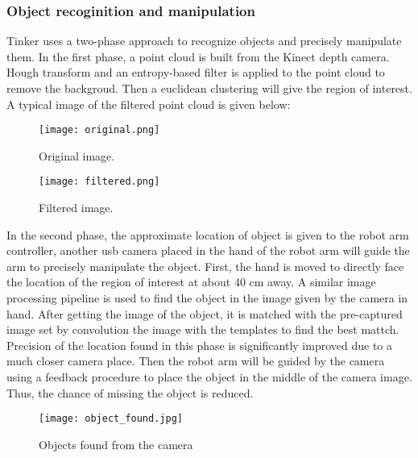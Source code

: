 \subsubsection{Object recoginition and manipulation}
Tinker uses a two-phase approach to recognize objects and precisely manipulate them. In the first phase, a point cloud is built from the Kinect depth camera. Hough transform and an entropy-based filter is applied to the point cloud to remove the backgroud. Then a euclidean clustering will give the region of interest. A typical image of the filtered point cloud is given below:
\begin{figure}[!t]
	\centering
    \texttt{[image: original.png]}
    \caption{Original image.}
\end{figure}

\begin{figure}[!t]
	\centering
    \texttt{[image: filtered.png]}
    \caption{Filtered image.}
\end{figure}

In the second phase, the approximate location of object is given to the robot arm controller, another usb camera placed in the hand of the robot arm will guide the arm to precisely manipulate the object. First, the hand is moved to directly face the location of the region of interest at about 40 cm away. A similar image processing pipeline is used to find the object in the image given by the camera in hand. After getting the image of the object, it is matched with the pre-captured image set by convolution the image with the templates to find the best mattch. Precision of the location found in this phase is significantly improved due to a much closer camera place. Then the robot arm will be guided by the camera using a feedback procedure to place the object in the middle of the camera image. Thus, the chance of missing the object is reduced.

\begin{figure}[!t]
	\centering
    \texttt{[image: object\_found.jpg]}
    \caption{Objects found from the camera}
\end{figure}
